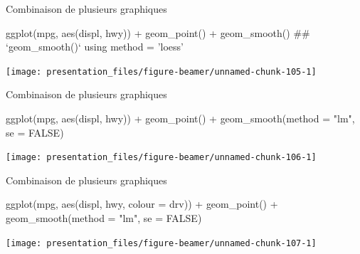 \documentclass[12pt,handout,ignorenonframetext,]{beamer}
\newenvironment{Shaded}{}{}
\newcommand{\KeywordTok}[1]{\textcolor[rgb]{0.00,0.00,1.00}{{#1}}}
\newcommand{\DataTypeTok}[1]{{#1}}
\newcommand{\StringTok}[1]{\textcolor[rgb]{0.00,0.50,0.50}{{#1}}}
\newcommand{\OtherTok}[1]{\textcolor[rgb]{1.00,0.25,0.00}{{#1}}}
\newcommand{\NormalTok}[1]{{#1}}
\renewenvironment{Shaded}{\begin{snugshade}}{\end{snugshade}}
\begin{document}
\begin{frame}[fragile]{Combinaison de plusieurs graphiques}

\footnotesize \center

\begin{Shaded}
\begin{Highlighting}[]
\KeywordTok{ggplot}\NormalTok{(mpg, }\KeywordTok{aes}\NormalTok{(displ, hwy)) +}
\StringTok{  }\KeywordTok{geom_point}\NormalTok{() +}\StringTok{ }\KeywordTok{geom_smooth}\NormalTok{()}
  \NormalTok{## `geom_smooth()` using method = 'loess'}
\end{Highlighting}
\end{Shaded}

\texttt{[image: presentation\_files/figure-beamer/unnamed-chunk-105-1]}

\end{frame}

\begin{frame}[fragile]{Combinaison de plusieurs graphiques}

\footnotesize \center

\begin{Shaded}
\begin{Highlighting}[]
\KeywordTok{ggplot}\NormalTok{(mpg, }\KeywordTok{aes}\NormalTok{(displ, hwy)) +}
\StringTok{  }\KeywordTok{geom_point}\NormalTok{() +}\StringTok{ }\KeywordTok{geom_smooth}\NormalTok{(}\DataTypeTok{method =} \StringTok{"lm"}\NormalTok{, }\DataTypeTok{se =} \OtherTok{FALSE}\NormalTok{)}
\end{Highlighting}
\end{Shaded}

\texttt{[image: presentation\_files/figure-beamer/unnamed-chunk-106-1]}

\end{frame}

\begin{frame}[fragile]{Combinaison de plusieurs graphiques}

\footnotesize \center

\begin{Shaded}
\begin{Highlighting}[]
\KeywordTok{ggplot}\NormalTok{(mpg, }\KeywordTok{aes}\NormalTok{(displ, hwy, }\DataTypeTok{colour =} \NormalTok{drv)) +}
\StringTok{  }\KeywordTok{geom_point}\NormalTok{() +}\StringTok{ }\KeywordTok{geom_smooth}\NormalTok{(}\DataTypeTok{method =} \StringTok{"lm"}\NormalTok{, }\DataTypeTok{se =} \OtherTok{FALSE}\NormalTok{)}
\end{Highlighting}
\end{Shaded}

\texttt{[image: presentation\_files/figure-beamer/unnamed-chunk-107-1]}

\end{frame}
\end{document}
